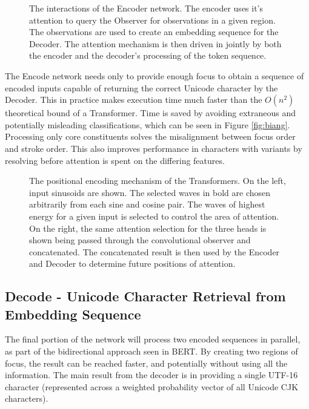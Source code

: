 \begin{figure*}[h]
    \begin{center}
        
        \caption[Encoder-Observer interaction]{The interactions of the Encoder network.
            The encoder uses it's attention to query the Observer for observations in a given region.
            The observations are used to create an embedding sequence for the Decoder.
            The attention mechanism is then driven in jointly by both the encoder and the decoder's processing of the token sequence. }
        \label{fig:encoder}
    \end{center}
\end{figure*}

The Encode network needs only to provide enough focus to obtain a sequence of encoded inputs capable of returning the correct Unicode character by the Decoder. This in practice makes execution time much faster than the $O(n^2)$ theoretical bound of a Transformer. Time is saved by avoiding extraneous and potentially misleading classifications, which can be seen in Figure \ref{fig:biang}. Processing only core constituents solves the misalignment between focus order and stroke order. This also improves performance in characters with variants by resolving before attention is spent on the differing features.

\begin{figure*}
    \begin{center}
        
        \caption[Multi-head Positional Encoding of Transformer]{The positional encoding mechanism of the Transformers. On the left, input sinusoids are shown. The selected waves in bold are chosen arbitrarily from each sine and cosine pair. The waves of highest energy for a given input is selected to control the area of attention. On the right, the same attention selection for the three heads is shown being passed through the convolutional observer and concatenated. The concatenated result is then used by the Encoder and Decoder to determine future positions of attention.}
        \label{fig:attention}
    \end{center}
\end{figure*}

\subsection{Decode - Unicode Character Retrieval from Embedding Sequence}
The final portion of the network will process two encoded sequences in parallel, as part of the bidirectional approach seen in BERT\cite{bert}. By creating two regions of focus, the result can be reached faster, and potentially without using all the information. The main result from the decoder is in providing a single UTF-16 character (represented across a weighted probability vector of all Unicode CJK characters).

